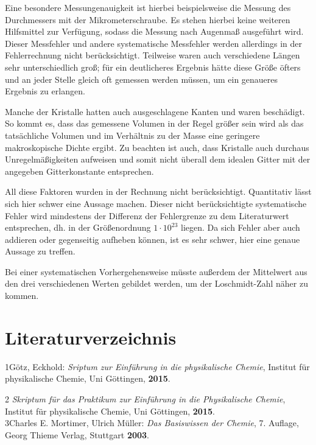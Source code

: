 \documentclass[12pt,a4paper,titlepage,headinclude,bibtotoc]{scrartcl}
\begin{document}
Eine besondere Messungenauigkeit ist hierbei beispielsweise die Messung des Durchmessers mit der Mikrometerschraube. Es stehen hierbei keine weiteren Hilfsmittel zur Verfügung, sodass die Messung nach Augenmaß ausgeführt wird. Dieser Messfehler und andere systematische Messfehler werden allerdings in der Fehlerrechnung nicht berücksichtigt. Teilweise waren auch verschiedene Längen sehr unterschiedlich groß; für ein deutlicheres Ergebnis hätte diese Größe öfters und an jeder Stelle gleich oft gemessen werden müssen, um ein genaueres Ergebnis zu erlangen. 

Manche der Kristalle hatten auch ausgeschlagene Kanten und waren beschädigt. So kommt es, dass das gemessene Volumen in der Regel größer sein wird als das tatsächliche Volumen und im Verhältnis zu der Masse eine geringere makroskopische Dichte ergibt. Zu beachten ist auch, dass Kristalle auch durchaus Unregelmäßigkeiten aufweisen und somit nicht überall dem idealen Gitter mit der angegeben Gitterkonstante entsprechen.

All diese Faktoren wurden in der Rechnung nicht berücksichtigt. Quantitativ lässt sich hier schwer eine Aussage machen. Dieser nicht berücksichtigte systematische Fehler wird mindestens der Differenz der Fehlergrenze zu dem Literaturwert entsprechen, dh. in der Größenordnung $1 \cdot 10^{23}$ liegen. Da sich Fehler aber auch addieren oder gegenseitig aufheben können, ist es sehr schwer, hier eine genaue Aussage zu treffen.

Bei einer systematischen Vorhergehensweise müsste außerdem der Mittelwert aus den drei verschiedenen Werten gebildet werden, um der Loschmidt-Zahl näher zu kommen.

\newpage

\section{Literaturverzeichnis}
1\quad Götz, Eckhold: \emph{Sriptum zur Einführung in die physikalische Chemie}, Institut für physikalische Chemie, Uni Göttingen, \textbf{2015}.

\vspace{0,5 cm}

2 \quad \emph{Skriptum für das Praktikum zur Einführung in die Physikalische Chemie}, Institut für physikalische Chemie, Uni Göttingen, \textbf{2015}.\\

3\quad Charles E. Mortimer, Ulrich Müller: \emph{Das Basiswissen der Chemie}, 7. Auflage, Georg Thieme Verlag, Stuttgart \textbf{2003}.
\end{document}
